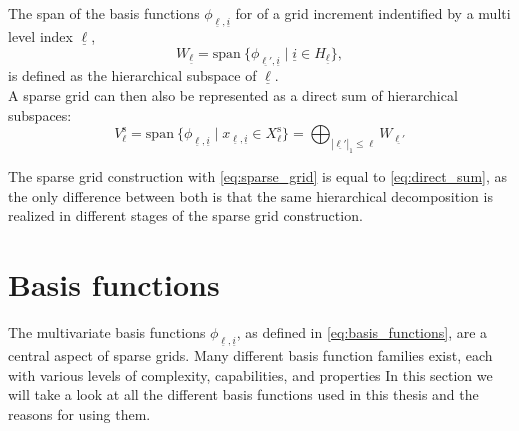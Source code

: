 \documentclass[
  a4paper,  %
  twoside,  %
  bibliography=totoc,
  headsepline,
  cleardoublepage=empty,
  parskip=half,
  draft=false
]{scrbook}
\begin{document}
\begin{definition}
The span of the basis functions $\phi_{\underline{\ell},\underline{i}}$ for of a grid increment indentified by a multi level index $\underline{\ell}$,
\begin{equation}
W_{\underline{\ell}}=\text{span}~ \{\phi_{\underline{\ell'},\underline{i}} \mid \underline{i} \in H_{\underline{\ell}}\},
\end{equation}
is defined as the hierarchical subspace of $\underline{\ell}$.\\
A sparse grid can then also be represented as a direct sum of hierarchical subspaces:
\begin{equation}
V^{\text{s}}_{\ell}=\text{span}~ \{\phi_{\underline{\ell},\underline{i}} \mid x_{\underline{\ell},\underline{i}} \in X^{\text{s}}_{\ell}\}=\bigoplus_{|\underline{\ell'}|_1 \leq \ell} W_{\underline{\ell'}}
\label{eq:direct_sum}
\end{equation}
\end{definition}

The sparse grid construction with \cref{eq:sparse_grid} is equal to \cref{eq:direct_sum}, as the only difference between both is that the same hierarchical decomposition is realized in different stages of the sparse grid construction.


\section{Basis functions}

The multivariate basis functions $\phi_{\underline{\ell},\underline{i}}$, as defined in \cref{eq:basis_functions}, are a central aspect of sparse grids.
Many different basis function families exist, each with various levels of complexity, capabilities, and properties
In this section we will take a look at all the different basis functions used in this thesis and the reasons for using them.
\end{document}
